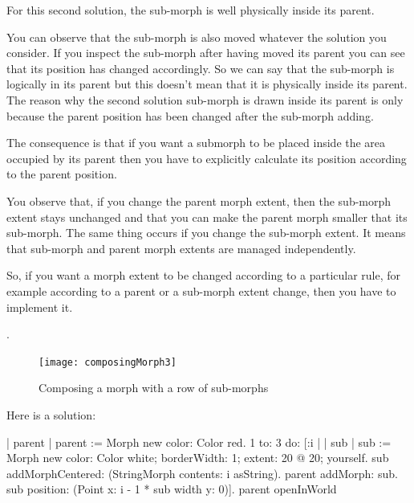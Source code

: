 \documentclass[a4paper,10pt,twoside]{book}
\begin{document}
For this second solution, the sub-morph is well physically inside its parent.


You can observe that the sub-morph is also moved whatever the solution you consider. If you inspect the sub-morph after having moved its parent you can see that its position has changed accordingly. So we can say that the sub-morph is logically in its parent but this doesn't mean that it is physically inside its parent. The reason why the second solution sub-morph is drawn inside its parent is only because the parent position has been changed after the sub-morph adding. 

The consequence is that if you want a submorph to be placed inside the area occupied by its parent then you have to explicitly calculate its position according to the parent position.


You observe that, if you change the parent morph extent, then the sub-morph extent stays unchanged and that you can make the parent morph smaller that its sub-morph. The same thing occurs if you change the sub-morph extent. It means that sub-morph and parent morph extents are managed independently.

So, if you want a morph extent to be changed according to a particular rule, for example according to a parent or a sub-morph extent change, then you have to implement it.

.

\begin{figure}[htbp]
\begin{center}
	\texttt{[image: composingMorph3]}
	\caption{Composing a morph with a row of sub-morphs}
\end{center}
\end{figure}
Here is a solution:
\begin{code}
| parent |
parent := Morph new color: Color red.
1 to: 3
 do: [:i | 	| sub |
	sub := Morph new color: Color white; borderWidth: 1; extent: 20 @ 20; yourself.
	sub addMorphCentered: (StringMorph contents: i asString).
	parent addMorph: sub.
	sub position: (Point x: i - 1 * sub width y: 0)].
parent openInWorld
\end{code}
\end{document}
